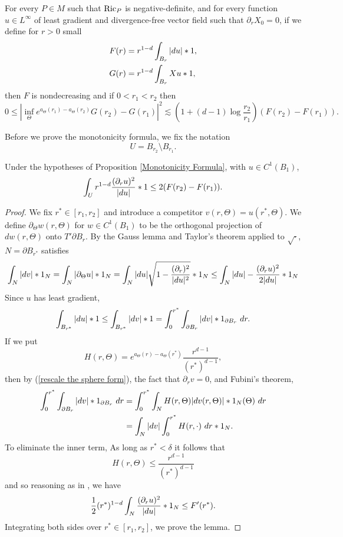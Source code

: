 \begin{proposition}\label{Monotonicity Formula}
For every $P \in M$ such that $\mathrm{Ric}_P$ is negative-definite, and for every function $u \in L^\infty$ of least gradient and divergence-free vector field such that $\partial_r X_0 = 0$, if we define for $r > 0$ small
\begin{align*}
    F(r) &= r^{1 - d} \int_{B_r} |du| *1,\\
    G(r) &= r^{1 - d} \int_{B_r} Xu *1,
\end{align*}
then $F$ is nondecreasing and if $0 < r_1 < r_2$ then
\begin{equation}\label{StrongMonotonicity}
0 \leq \left|\inf_\Theta e^{a_\Theta(r_1) - a_\Theta(r_2)}G(r_2) - G(r_1)\right|^2 \lesssim \left(1 + (d - 1)\log \frac{r_2}{r_1}\right)(F(r_2) - F(r_1)).
\end{equation}
\end{proposition}

Before we prove the monotonicity formula, we fix the notation
$$U = B_{r_2} \setminus B_{r_1}.$$

\begin{lemma}\label{monotonicity lemma}
Under the hypotheses of Proposition \ref{Monotonicity Formula}, with $u \in C^1(B_1)$,
$$\int_U r^{1 - d}\frac{(\partial_ru)^2}{|du|} *1 \leq 2(F(r_2) - F(r_1)).$$
\end{lemma}
\begin{proof}
We fix $r^* \in [r_1, r_2]$ and introduce a competitor $v(r, \Theta) = u(r^*, \Theta)$. We define $\partial_\Theta w(r, \Theta)$ for $w \in C^1(B_1)$ to be the orthogonal projection of $dw(r, \Theta)$ onto $T'\partial B_r$.
By the Gauss lemma and Taylor's theorem applied to $\sqrt\cdot$, $N = \partial B_{r^*}$ satisfies
\begin{align*}
\int_N |dv| *1_N = \int_N |\partial_\Theta u| *1_N = \int_N |du|\sqrt{1 - \frac{(\partial_r)^2}{|du|^2}} *1_N \leq \int_N |du| - \frac{(\partial_ru)^2}{2|du|} *1_N
\end{align*}
Since $u$ has least gradient,
$$\int_{B_{r^*}} |du| *1 \leq \int_{B_{r^*}} |dv| *1 = \int_0^{r^*} \int_{\partial B_r} |dv| *1_{\partial B_r} ~dr.$$
If we put
$$H(r, \Theta) = e^{a_\Theta(r) - a_\Theta(r^*)} \frac{r^{d - 1}}{(r^*)^{d - 1}},$$
then by (\ref{rescale the sphere form}), the fact that $\partial_r v = 0$, and Fubini's theorem,
\begin{align*}
    \int_0^{r^*} \int_{\partial B_r} |dv| *1_{\partial B_r} ~dr &= \int_0^{r^*} \int_N H(r, \Theta) |dv(r, \Theta)| *1_N(\Theta) ~dr\\
    &= \int_N |dv| \int_0^{r^*} H(r, \cdot) ~dr *1_N.
\end{align*}
To eliminate the inner term,
As long as $r^* < \delta$ it follows that
$$H(r, \Theta) \leq \frac{r^{d - 1}}{(r^*)^{d - 1}}$$
and so reasoning as in \cite[pg68]{Giusti77}, we have
$$\frac{1}{2} (r^*)^{1 - d} \int_N \frac{(\partial_ru)^2}{|du|} *1_N \leq F'(r^*).$$
Integrating both sides over $r^* \in [r_1, r_2]$, we prove the lemma.
\end{proof}

